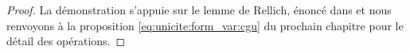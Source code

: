 \documentclass[12pt,%
    twoside,%
    a4paper,%
    openright, %
    ]{book}
\numberwithin{equation}{section} %
\newtheorem{lemme}[thm]{Lemme}
\renewcommand{\frac}[2]{\dfrac{#1}{#2}} %
\newcommand{\vect}[1]{{\overset{\rightarrow}{#1}}}
\newcommand{\conj}[1]{{\overline{#1}}}
\newcommand{\norm}[1]{\left\lVert#1\right\rVert}
\newcommand{\dd}{\mathrm{d}}
\newcommand{\OO}{\Omega}
\renewcommand{\Re}{\operatorname{Re}}
\newcommand{\Tr}{\operatorname{T_R}}
\newcommand{\vE}{\vect{E}}
\newcommand{\cH}{\mathcal{H}}
\newcommand{\vH}{\vect{\cH}}
\newcommand{\vx}{\vect{x}}
\newcommand{\vJ}{\vect{J}}
\newcommand{\trot}{{\vect{\operatorname{rot}}}}
\begin{document}
    \begin{proof}
      La démonstration s'appuie sur le lemme de Rellich, énoncé dans \cite[p.~74]{cessenat_mathematical_1996} et nous renvoyons à la proposition \ref{eq:unicite:form_var:cgu} du prochain chapitre pour le détail des opérations.


      
      
    
    \end{proof}      
\end{document}
